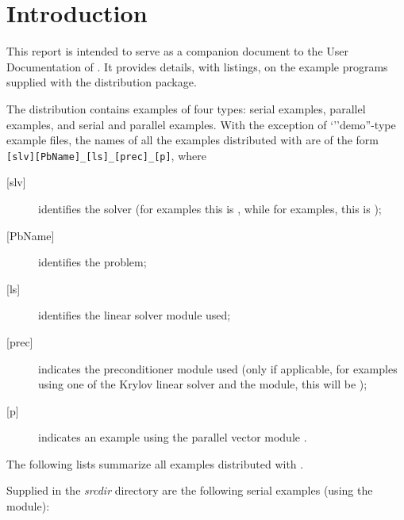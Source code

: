 \section{Introduction}\label{s:ex_intro}

This report is intended to serve as a companion document to the User
Documentation of {\kinsol} \cite{kinsol_ug}.  It provides details, with
listings, on the example programs supplied with the {\kinsol} distribution
package.

The {\kinsol} distribution contains examples of four types: serial
{\C} examples, parallel {\C} examples, and serial and parallel {\F}
examples.
With the exception of `''demo''-type example files, the names of all the examples 
distributed with {\sundials} are of the form \verb![slv][PbName]_[ls]_[prec]_[p]!, 
where
\begin{description}
\item [{[slv]}] identifies the solver (for {\kinsol} examples this is , 
  while for {\fkinsol} examples, this is );
\item [{[PbName]}] identifies the problem;
\item [{[ls]}] identifies the linear solver module used;
\item [{[prec]}] indicates the {\kinsol} preconditioner module used
  (only if applicable, for examples using one of the Krylov linear solver
  and the {\kinbbdpre} module, this will be );
\item [{[p]}] indicates an example using the parallel vector module {\nvecp}.
\end{description}

\vspace{0.2in}\noindent
The following lists summarize all examples distributed with {\kinsol}.

\vspace{0.2in}\noindent
Supplied in the {\em srcdir} directory are the
following serial examples (using the {\nvecs} module):

